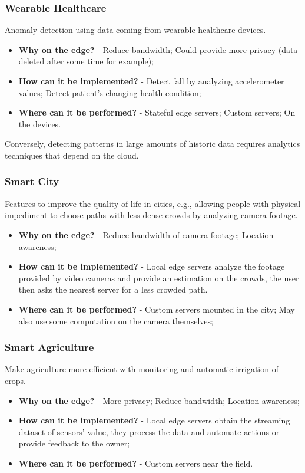 \subsubsection{Wearable Healthcare}
Anomaly detection using data coming from wearable healthcare devices.
\begin{itemize}
    \item \textbf{Why on the edge?} - Reduce bandwidth; Could provide more privacy (data deleted after some time for example);
    \item \textbf{How can it be implemented?} - Detect fall by analyzing accelerometer values; Detect patient’s changing health condition;
    \item \textbf{Where can it be performed?} - Stateful edge servers; Custom servers; On the devices.
\end{itemize}
Conversely, detecting patterns in large amounts of historic data requires analytics techniques that depend on the cloud.


\subsubsection{Smart City}
Features to improve the quality of life in cities, e.g., allowing people with physical impediment to choose paths with less dense crowds by analyzing camera footage.
\begin{itemize}
    \item \textbf{Why on the edge?} - Reduce bandwidth of camera footage; Location awareness;
    \item \textbf{How can it be implemented?} - Local edge servers analyze the footage provided by video cameras and provide an estimation on the crowds, the user then asks the nearest server for a less crowded path.
    \item \textbf{Where can it be performed?} - Custom servers mounted in the city; May also use some computation on the camera themselves;
\end{itemize}


\subsubsection{Smart Agriculture}
Make agriculture more efficient with monitoring and automatic irrigation of crops.
\begin{itemize}
    \item \textbf{Why on the edge?} - More privacy; Reduce bandwidth; Location awareness;
    \item \textbf{How can it be implemented?} - Local edge servers obtain the streaming dataset of sensors’ value, they process the data and automate actions or provide feedback to the owner;
    \item \textbf{Where can it be performed?} - Custom servers near the field.
\end{itemize}


